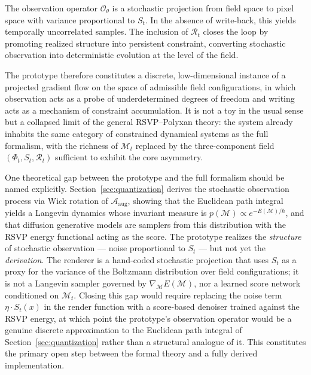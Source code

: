 \documentclass[11pt]{article}
\begin{document}
The observation operator $\mathcal{O}_\theta$ is a stochastic projection
from field space to pixel space with variance proportional to $S_t$.
In the absence of write-back, this yields temporally uncorrelated samples.
The inclusion of $\mathcal{R}_t$ closes the loop by promoting realized
structure into persistent constraint, converting stochastic observation
into deterministic evolution at the level of the field.

The prototype therefore constitutes a discrete, low-dimensional instance
of a projected gradient flow on the space of admissible field
configurations, in which observation acts as a probe of underdetermined
degrees of freedom and writing acts as a mechanism of constraint
accumulation.
It is not a toy in the usual sense but a collapsed limit of the general
RSVP--Polyxan theory: the system already inhabits the same category of
constrained dynamical systems as the full formalism, with the richness of
$\mathcal{M}_t$ replaced by the three-component field $(\Phi_t, S_t,
\mathcal{R}_t)$ sufficient to exhibit the core asymmetry.

One theoretical gap between the prototype and the full formalism should
be named explicitly.
Section~\ref{sec:quantization} derives the stochastic observation process
via Wick rotation of $\mathcal{A}_{\text{aug}}$, showing that the
Euclidean path integral yields a Langevin dynamics whose invariant measure
is $p(\mathcal{M}) \propto e^{-E(\mathcal{M})/\hbar}$, and that diffusion
generative models are samplers from this distribution with the RSVP energy
functional acting as the score.
The prototype realizes the \emph{structure} of stochastic observation ---
noise proportional to $S_t$ --- but not yet the \emph{derivation}.
The renderer is a hand-coded stochastic projection that uses $S_t$ as a
proxy for the variance of the Boltzmann distribution over field
configurations; it is not a Langevin sampler governed by
$\nabla_{\mathcal{M}} E(\mathcal{M})$, nor a learned score network
conditioned on $\mathcal{M}_t$.
Closing this gap would require replacing the noise term
$\eta \cdot S_t(x)$ in the render function with a score-based denoiser
trained against the RSVP energy, at which point the prototype's
observation operator would be a genuine discrete approximation to the
Euclidean path integral of Section~\ref{sec:quantization} rather than
a structural analogue of it.
This constitutes the primary open step between the formal theory and a
fully derived implementation.

\end{document}
